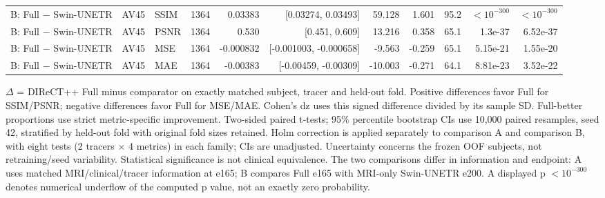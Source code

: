 \documentclass{article}
\providecommand{\DIFaddtex}[1]{{\protect\color{blue} \sf #1}} %
\providecommand{\DIFaddFL}[1]{\DIFadd{#1}} %
\providecommand{\DIFadd}[1]{\texorpdfstring{\DIFaddtex{#1}}{#1}} %
\begin{document}
\begin{table}[t]
{\begin{tabular}{lllrrrrrrrr}
B: Full $-$ Swin-UNETR & AV45 & SSIM & 1364 & 0.03383 & [0.03274, 0.03493] & 59.128 & 1.601 & 95.2 & $<10^{-300}$ & $<10^{-300}$ \\
B: Full $-$ Swin-UNETR & AV45 & PSNR & 1364 & 0.530 & [0.451, 0.609] & 13.216 & 0.358 & 65.1 & 1.3e-37 & 6.52e-37 \\
B: Full $-$ Swin-UNETR & AV45 & MSE & 1364 & -0.000832 & [-0.001003, -0.000658] & -9.563 & -0.259 & 65.1 & 5.15e-21 & 1.55e-20 \\
B: Full $-$ Swin-UNETR & AV45 & MAE & 1364 & -0.00383 & [-0.00459, -0.00309] & -10.003 & -0.271 & 64.1 & 8.81e-23 & 3.52e-22 \\
\hline
\end{tabular}}
\par\smallskip
\begin{minipage}{\textwidth}\footnotesize
\DIFaddFL{$\Delta$ = DIReCT++ Full minus comparator on exactly matched subject, tracer and held-out fold. Positive differences favor Full for SSIM/PSNR; negative differences favor Full for MSE/MAE. Cohen's dz uses this signed difference divided by its sample SD. Full-better proportions use strict metric-specific improvement. Two-sided paired t-tests; 95\% percentile bootstrap CIs use 10,000 paired resamples, seed 42, stratified by held-out fold with original fold sizes retained. Holm correction is applied separately to comparison A and comparison B, with eight tests (2 tracers $\times$ 4 metrics) in each family; CIs are unadjusted. Uncertainty concerns the frozen OOF subjects, not retraining/seed variability. Statistical significance is not clinical equivalence. The two comparisons differ in information and endpoint: A uses matched MRI/clinical/tracer information at e165; B compares Full e165 with MRI-only Swin-UNETR e200. A displayed p $<10^{-300}$ denotes numerical underflow of the computed p value, not an exactly zero probability.
}\end{minipage}
\end{table}

\end{document}
